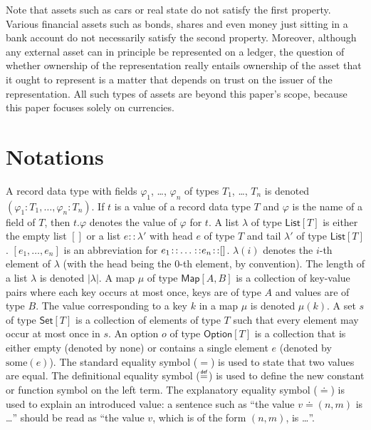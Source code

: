 \documentclass{llncs}
\newcommand{\defeq}{\mathrel{\overset{\makebox[0pt]{\mbox{\normalfont\tiny\sffamily def}}}{=}}}
\newcommand{\expeq}{\doteq}
\newcommand{\cons}{\colon\hspace{-3pt}\colon\hspace{-3pt}}
\newcommand{\append}{\colon\hspace{-3pt}\colon\hspace{-3pt}\colon\hspace{-3pt}}
\newcommand{\hash}[1]{#1^{\scriptscriptstyle\#}}
\newcommand{\nil}{[]}
\newcommand{\type}[1]{\mathsf{#1}}
\newcommand{\listT}{\type{List}}
\newcommand{\setT}{\type{Set}}
\newcommand{\mapT}{\type{Map}}
\newcommand{\maybeT}{\type{Option}}
\newcommand{\func}[1]{\mathrm{#1}}
\newcommand{\nothing}{\func{none}}
\newcommand{\just}{\func{some}}
\begin{document}
Note that assets such as cars or real state do not satisfy the first property. Various financial assets such as bonds, shares and even money just sitting in a bank account do not necessarily satisfy the second property. Moreover, although any external asset can in principle be represented on a ledger, the question of whether ownership of the representation really entails ownership of the asset that it ought to represent is a matter that depends on trust on the issuer of the representation. All such types of assets are beyond this paper's scope, because this paper focuses solely on currencies.


\section{Notations}

A record data type with fields $\varphi_1$, \ldots, $\varphi_n$ of types $T_1$, \ldots, $T_n$ is denoted $(\varphi_1\colon T_1,\ldots,\varphi_n\colon T_n)$. 
If $t$ is a value of a record data type $T$ and $\varphi$ is the name of a field of $T$, then $t.\varphi$ denotes the value of $\varphi$ for $t$. 
A list $\lambda$ of type $\listT[T]$ is either the empty list $\nil$ or 
a list $e::\lambda'$ with head $e$ of type $T$ and tail $\lambda'$ of type $\listT[T]$. $[e_1, \ldots, e_n]$ is an abbreviation for $e_1\cons\ldots\cons e_n\cons\nil$. $\lambda(i)$ denotes the $i$-th element of $\lambda$ (with the head being the 0-th element, by convention).
The length of a list $\lambda$ is denoted $|\lambda|$. 
A map $\mu$ of type $\mapT[A, B]$ is a collection of key-value pairs where each key occurs at most once, keys are of type $A$ and values are of type $B$. The value corresponding to a key $k$ in a map $\mu$ is denoted $\mu(k)$. A set $s$ of type $\setT[T]$ is a collection of elements of type $T$ such that every element may occur at most once in $s$. An option $o$ of type $\maybeT[T]$ is a collection that is either empty (denoted by $\nothing$) or contains a single element $e$ (denoted by $\just(e)$).
The standard equality symbol ($=$) is used to state that two values are equal. The definitional equality symbol ($\defeq$) is used to define the new constant or function symbol on the left term. The explanatory equality symbol ($\expeq$) is used to explain an introduced value: a sentence such as ``the value $v \expeq (n, m)$ is \ldots'' should be read as ``the value $v$, which is of the form $(n,m)$, is \ldots''. 
\end{document}
